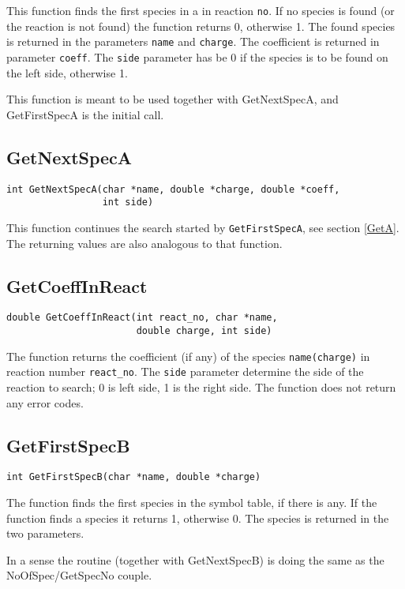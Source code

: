 This function finds the first species in a in reaction {\tt no}. If no
species is found (or the reaction is not found) the function 
returns 0, otherwise 1. The found species is returned in the
parameters {\tt name} and {\tt charge}. The coefficient
is returned in parameter {\tt coeff}. The {\tt side} parameter has be
0 if the species is to be found on the left side, otherwise 1.

This function is meant to be used together with GetNextSpecA,
and GetFirstSpecA is the initial call.

\subsection{GetNextSpecA}
\begin{verbatim}
int GetNextSpecA(char *name, double *charge, double *coeff, 
                 int side)
\end{verbatim}

This function continues the search started by {\tt GetFirstSpecA}, 
see section \ref{GetA}. The returning values are also analogous to 
that function.

\subsection{GetCoeffInReact}
\begin{verbatim}
double GetCoeffInReact(int react_no, char *name, 
                       double charge, int side)
\end{verbatim}

The function returns the coefficient (if any) of the species
{\tt name(charge)} in reaction 
number {\tt react{\_}no}. The {\tt side} parameter determine the side of
the reaction to search; 0 is left side, 1 is the right side. The
function does not return any error codes.

\subsection{GetFirstSpecB}
\label{GetB}
\begin{verbatim}
int GetFirstSpecB(char *name, double *charge)
\end{verbatim}

The function finds the first species in the symbol table, if there 
is any. If the function
finds a species it returns 1, otherwise 0. The species is returned 
in the two parameters.

In a sense the routine (together with GetNextSpecB) is doing the same
as the NoOfSpec/GetSpecNo couple.

